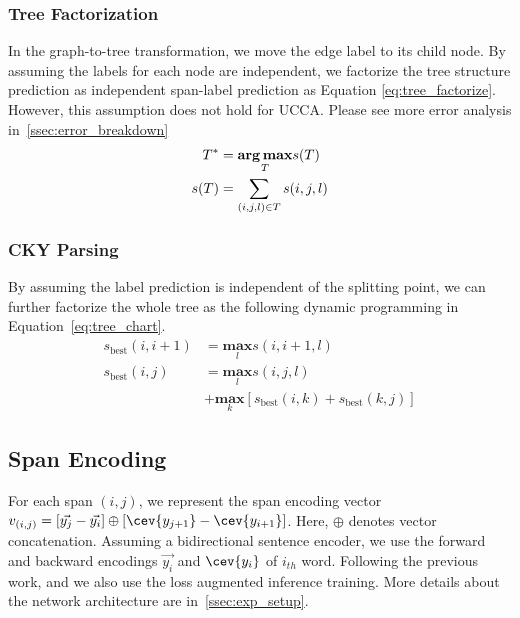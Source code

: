 \subsubsection{Tree Factorization}
\label{sssec:phr:tree-factorization}
In the graph-to-tree transformation, we move the edge label to its
child node. By assuming the labels for each node are independent, we
factorize the tree structure prediction as independent span-label
prediction as Equation \ref{eq:tree_factorize}. However, this
assumption does not hold for UCCA.  Please see more error analysis
in~\autoref{ssec:error_breakdown}
\begin{equation}
  \label{eq:tree_factorize}
 \begin{aligned} T^{*}  & = \underset{T}{\textbf{arg\,max}} s(T)     \\ s(T)
                        & = \sum_{(i,j,l) \in T} s(i,j,l)
\end{aligned}
\end{equation}

\subsubsection{CKY Parsing}
\label{sssec:phr:cky-parsing}
By assuming the label prediction is independent of the splitting
point, we can further factorize the whole tree as the following
dynamic programming in Equation~\ref{eq:tree_chart}.
\begin{equation}
  \label{eq:tree_chart}
\begin{aligned}
      s_{\text{best}}(i, i+1) & = \underset{l}{\textbf{max}} s(i,i+1, l) \\
      s_{\text{best}}(i, j) & = \underset{l}{\textbf{max}} s(i,j, l)
      \\ & + \underset{k}{\textbf{max}}[ s_{\text{best}}(i,k) +
      s_{\text{best}}(k,j) ]
\end{aligned}
\end{equation}

\subsection{Span Encoding}
\label{ssec:phr:span}

For each span $(i,j)$, we represent the span encoding vector
$v_{(i,j)} = [\vec{y_{j}} - \vec{y_{i}}] \oplus [\cev{y_{j+1}} -
\cev{y_{i+1}}] $. Here, $\oplus$ denotes vector concatenation. Assuming a
bidirectional sentence encoder, we use the forward and backward
encodings $\vec{y_{i}}$ and $\cev{y_{i}}$ of $i_{th}$ word. Following
the previous work, and we also use the loss augmented inference
training. More details about the network
architecture are in~\autoref{ssec:exp_setup}.

